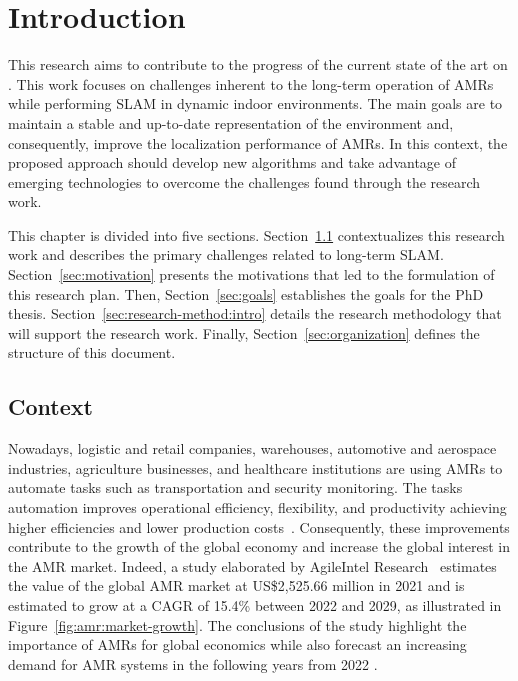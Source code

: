\chapter{Introduction}\label{chap:intro}

This research aims to contribute to the progress of the current state of the art on . This work focuses on challenges inherent to the long-term operation of \glspl{AMR} while performing SLAM in dynamic indoor environments. The main goals are to maintain a stable and up-to-date representation of the environment and, consequently, improve the localization performance of \glspl{AMR}. In this context, the proposed approach should develop new algorithms and take advantage of emerging technologies to overcome the challenges found through the research work.

This chapter is divided into five sections.
Section~\ref{sec:context} contextualizes this research work and describes the primary challenges related to long-term \gls{SLAM}.
Section~\ref{sec:motivation} presents the motivations that led to the formulation of this research plan.
Then, Section~\ref{sec:goals} establishes the goals for the PhD thesis.
Section~\ref{sec:research-method:intro} details the research methodology that will support the research work.
Finally, Section~\ref{sec:organization} defines the structure of this document.






\section{Context}\label{sec:context}

Nowadays, logistic and retail companies, warehouses, automotive and aerospace industries, agriculture businesses, and healthcare institutions are using \glspl{AMR} to automate tasks such as transportation and security monitoring. The tasks automation improves operational efficiency, flexibility, and productivity achieving higher efficiencies and lower production costs~\cite{amr:overview:intel}.
Consequently, these improvements contribute to the growth of the global economy and increase the global interest in the \gls{AMR} market. Indeed, a study elaborated by AgileIntel Research~\cite{amr:market-growth} estimates the value of the global \gls{AMR} market at US\$2,525.66 million in 2021 and is estimated to grow at a \gls{CAGR} of 15.4\% between 2022 and 2029, as illustrated in Figure~\ref{fig:amr:market-growth}.
The conclusions of the study highlight the importance of \glspl{AMR} for global economics while also forecast an increasing demand for \gls{AMR} systems in the following years from 2022 \cite{amr:market-growth}.

